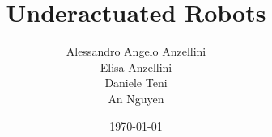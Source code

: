 \documentclass[12pt,a4paper,oneside]{article}
\title{Underactuated Robots}
\author{Alessandro Angelo Anzellini\\ Elisa Anzellini \\ Daniele Teni\\ An Nguyen}
\date{\today} %
\theoremstyle{definition}
\begin{document}

\newpage
\tableofcontents
\newpage

\clearpage

\clearpage

\clearpage

\clearpage

\clearpage
%
\clearpage


\nocite{*}  %
\end{document}
